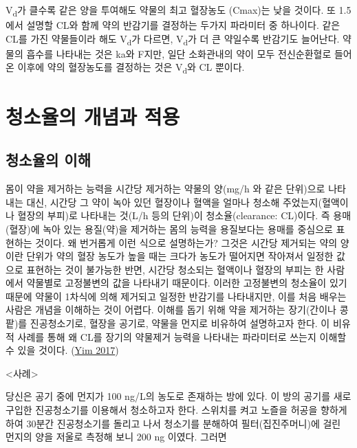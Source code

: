\documentclass[
  11pt,
  krantz2, a4paper, twoside]{krantz}
\begin{document}
V\textsubscript{d}가 클수록 같은 양을 투여해도 약물의 최고 혈장농도 (Cmax)는 낮을
것이다. 또 1.5에서 설명할 CL와 함께 약의 반감기를 결정하는 두가지
파라미터 중 하나이다. 같은 CL를 가진 약물들이라 해도 V\textsubscript{d}가 다르면,
V\textsubscript{d}가 더 큰 약일수록 반감기도 늘어난다. 약물의 흡수를 나타내는 것은
ka와 F지만, 일단 소화관내의 약이 모두 전신순환혈로 들어온 이후에 약의
혈장농도를 결정하는 것은 V\textsubscript{d}와 CL 뿐이다.

\hypertarget{uxccaduxc18cuxc728uxc758-uxac1cuxb150uxacfc-uxc801uxc6a9}{%
\section{청소율의 개념과 적용}\label{uxccaduxc18cuxc728uxc758-uxac1cuxb150uxacfc-uxc801uxc6a9}}

\hypertarget{uxccaduxc18cuxc728uxc758-uxc774uxd574}{%
\subsection{청소율의 이해}\label{uxccaduxc18cuxc728uxc758-uxc774uxd574}}

몸이 약을 제거하는 능력을 시간당 제거하는 약물의 양(mg/h 와 같은
단위)으로 나타내는 대신, 시간당 그 약이 녹아 있던 혈장이나 혈액을 얼마나
청소해 주었는지(혈액이나 혈장의 부피)로 나타내는 것(L/h 등의 단위)이
청소율(clearance: CL)이다. 즉 용매(혈장)에 녹아 있는 용질(약)을 제거하는
몸의 능력을 용질보다는 용매를 중심으로 표현하는 것이다. 왜 번거롭게 이런
식으로 설명하는가? 그것은 시간당 제거되는 약의 양이란 단위가 약의 혈장
농도가 높을 때는 크다가 농도가 떨어지면 작아져서 일정한 값으로 표현하는
것이 불가능한 반면, 시간당 청소되는 혈액이나 혈장의 부피는 한 사람에서
약물별로 고정불변의 값을 나타내기 때문이다. 이러한 고정불변의 청소율이
있기 때문에 약물이 1차식에 의해 제거되고 일정한 반감기를 나타내지만,
이를 처음 배우는 사람은 개념을 이해하는 것이 어렵다. 이해를 돕기 위해
약을 제거하는 장기(간이나 콩팥)를 진공청소기로, 혈장을 공기로, 약물을
먼지로 비유하여 설명하고자 한다. 이 비유적 사례를 통해 왜 CL를 장기의
약물제거 능력을 나타내는 파라미터로 쓰는지 이해할 수 있을 것이다. (\protect\hyperlink{ref-yim2017tutorial}{Yim 2017})

\textless 사례\textgreater{}

당신은 공기 중에 먼지가 100 ng/L의 농도로 존재하는 방에 있다. 이 방의
공기를 새로 구입한 진공청소기를 이용해서 청소하고자 한다. 스위치를 켜고
노즐을 허공을 향하게 하여 30분간 진공청소기를 돌리고 나서 청소기를
분해하여 필터(집진주머니)에 걸린 먼지의 양을 저울로 측정해 보니 200 ng
이였다. 그러면
\end{document}
